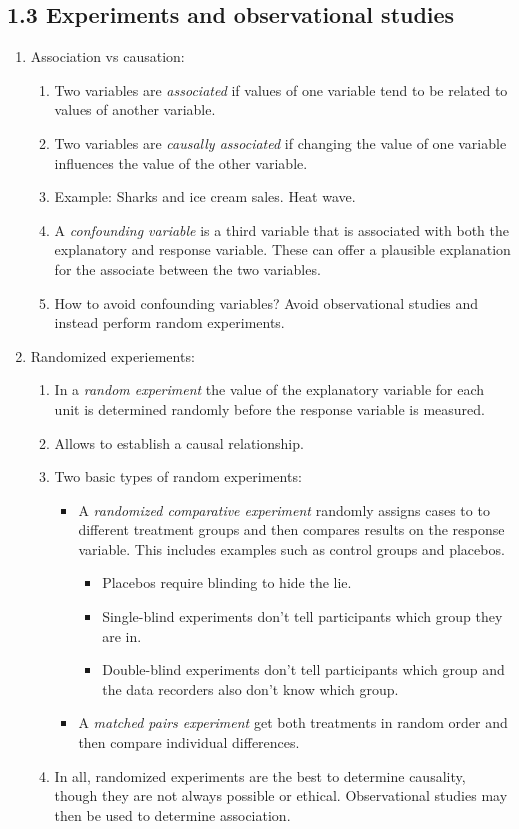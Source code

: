 \documentclass{article}
\begin{document}
\subsection{1.3 Experiments and observational studies}
\begin{enumerate}

\item Association vs causation:
\begin{enumerate}
\item Two variables are \emph{associated} if values of one variable tend to be related to values of another variable.
\item Two variables are \emph{causally associated} if changing the value of one variable influences the value of the other variable.
\item Example: Sharks and ice cream sales. Heat wave.
\item A \emph{confounding variable} is a third variable that is associated with both the explanatory and response variable. These can offer a plausible explanation for the associate between the two variables.
\item How to avoid confounding variables? Avoid observational studies and instead perform random experiments.
\end{enumerate}

\item Randomized experiements:
\begin{enumerate}
\item In a \emph{random experiment} the value of the explanatory variable for each unit is determined randomly before the response variable is measured. 
\item Allows to establish a causal relationship.
\item Two basic types of random experiments:
\begin{itemize}
\item A \emph{randomized comparative experiment} randomly assigns cases to to different treatment groups and then compares results on the response variable. This includes examples such as control groups and placebos. 
\begin{itemize}
\item Placebos require blinding to hide the lie. 
\item Single-blind experiments don't tell participants which group they are in.
\item Double-blind experiments don't tell participants which group and the data recorders also don't know which group.
\end{itemize}
\item A \emph{matched pairs experiment} get both treatments in random order and then compare individual differences.
\end{itemize}
\item In all, randomized experiments are the best to determine causality, though they are not always possible or ethical. Observational studies may then be used to determine association.
\end{enumerate}


\end{enumerate}
\end{document}
